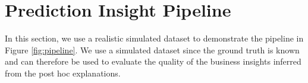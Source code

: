 \documentclass[11pt]{article}    %
\begin{document}
        


\section{Prediction Insight Pipeline}
\label{sec:dataset}
In this section, we use a realistic simulated dataset to demonstrate the pipeline in Figure  \ref{fig:pipeline}. We use a simulated dataset since the ground truth is known and can therefore be used to evaluate the quality of the business insights inferred from the post hoc explanations. 
\end{document}
